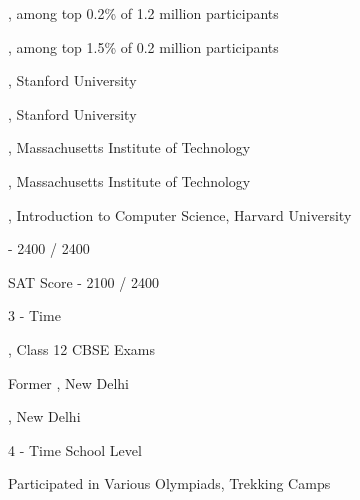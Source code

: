 \documentclass[]{deedy-resume-openfont}
\begin{document}
\vspace{\topsep} %
\vspace{\topsep} %
\begin{large}
\begin{tightemize}
\item {}, among top 0.2\% of 1.2 million participants
\item {}, among top 1.5\% of 0.2 million participants
\item {}, Stanford University
\item {}, Stanford University
\item {}, Massachusetts Institute of Technology
\item {}, Massachusetts Institute of Technology
\item {}, Introduction to Computer Science, Harvard University
\item {} - 2400 / 2400
\item SAT Score - 2100 / 2400
\item 3 - Time 
\item {}, Class 12 CBSE Exams
\end{tightemize}
\end{large}
\vspace{\topsep} %


\vspace{\topsep} %
\begin{large}
\begin{tightemize}
\item Former , New Delhi
\item {}, New Delhi
\item 4 - Time School Level 
\item Participated in Various Olympiads, Trekking Camps
\end{tightemize}
\end{large}
\end{document}
